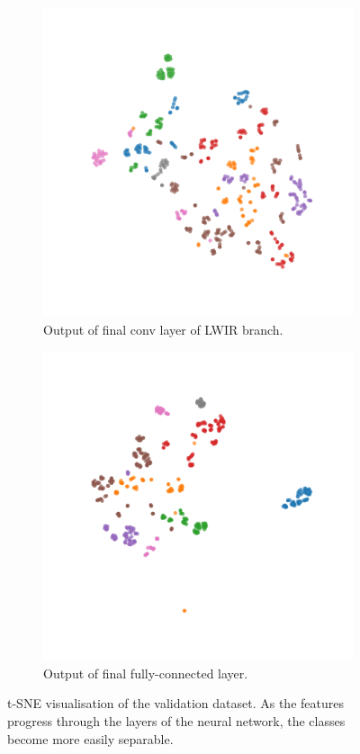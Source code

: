 \documentclass{l4proj}
\begin{document}
\begin{figure}[ht]
  \begin{subfigure}[h!]{0.4\textwidth}
    \includegraphics[width=\textwidth, trim={1cm 1cm 1cm 1cm}, clip]{images/evaluation/embedding/val/lwir}
    \caption{Output of final conv layer of LWIR branch.}
    \label{fig:test_tsne_lwir}
  \end{subfigure}
  \quad
  \begin{subfigure}[h!]{0.4\textwidth}
    \includegraphics[width=\textwidth, trim={1cm 1cm 1cm 1cm}, clip]{images/evaluation/embedding/val/fc}
    \caption{Output of final fully-connected layer.}
    \label{fig:test_tsne_fc}
  \end{subfigure}
  \caption{t-SNE visualisation of the validation dataset. As the features progress through the layers of the neural network, the classes become more easily separable.}
  \label{fig:test_tsne}
\end{figure}
\end{document}
